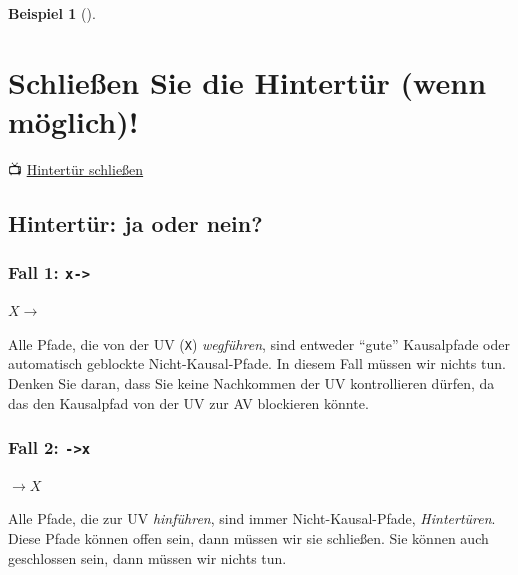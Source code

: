\documentclass[
  ngerman,
  letterpaper,
  twoside,
  open=any]{scrbook}
\theoremstyle{definition}
\newtheorem{example}{Beispiel}[chapter]
\theoremstyle{plain}
\theoremstyle{definition}
\theoremstyle{definition}
\theoremstyle{remark}
\begin{document}
\begin{example}[]
\section{Schließen Sie die Hintertür (wenn
möglich)!}\label{schlieuxdfen-sie-die-hintertuxfcr-wenn-muxf6glich}

📺 \href{https://www.youtube.com/watch?v=Hns1UIYKTds}{Hintertür
schließen}

\subsection{Hintertür: ja oder nein?}\label{hintertuxfcr-ja-oder-nein}

\subsubsection{\texorpdfstring{Fall 1:
\texttt{x-\textgreater{}}}{Fall 1: x-\textgreater{}}}\label{fall-1-x-}

\(\boxed{X \rightarrow}\)

Alle Pfade, die von der UV (\texttt{X}) \emph{wegführen}, sind entweder
\enquote{gute} Kausalpfade oder automatisch geblockte
Nicht-Kausal-Pfade. In diesem Fall müssen wir nichts tun. Denken Sie
daran, dass Sie keine Nachkommen der UV kontrollieren dürfen, da das den
Kausalpfad von der UV zur AV blockieren könnte.

\subsubsection{\texorpdfstring{Fall 2:
\texttt{-\textgreater{}x}}{Fall 2: -\textgreater x}}\label{fall-2--x}

\(\boxed{\rightarrow X}\)

Alle Pfade, die zur UV \emph{hinführen}, sind immer Nicht-Kausal-Pfade,
\emph{Hintertüren}. Diese Pfade können offen sein, dann müssen wir sie
schließen. Sie können auch geschlossen sein, dann müssen wir nichts tun.

\begin{tcolorbox}[enhanced jigsaw, arc=.35mm, bottomrule=.15mm, bottomtitle=1mm, breakable, colback=white, colbacktitle=quarto-callout-tip-color!10!white, colframe=quarto-callout-tip-color-frame, coltitle=black, left=2mm, leftrule=.75mm, opacityback=0, opacitybacktitle=0.6, rightrule=.15mm, title=\textcolor{quarto-callout-tip-color}{\faLightbulb}\hspace{0.5em}{Tipp}, titlerule=0mm, toprule=.15mm, toptitle=1mm]


\end{tcolorbox}
\end{example}
\end{document}
